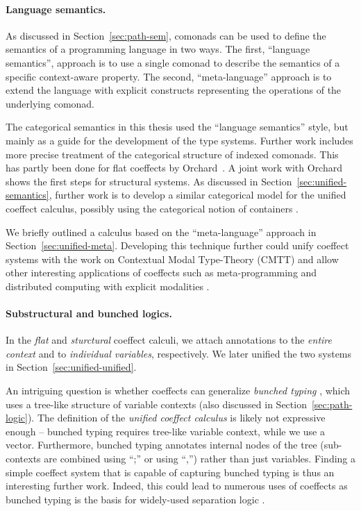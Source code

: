 \paragraph{Language semantics.}

As discussed in Section~\ref{sec:path-sem}, comonads can be used to define the semantics of a
programming language in two ways. The first, ``language semantics'', approach is to use a 
single comonad to describe the semantics of a specific context-aware property. The second,
``meta-language'' approach is to extend the language with explicit constructs representing the 
operations of the underlying comonad.

The categorical semantics in this thesis used the ``language semantics'' style, but mainly as a
guide for the development of the type systems. Further work includes more precise treatment of
the categorical structure of indexed comonads. This has partly been done for flat coeffects by
Orchard~\cite{comonads-dom-thesis}. A joint work with Orchard~\cite{coeffects-icfp14} shows the
first steps for structural systems. As discussed in Section~\ref{sec:unified-semantics}, further
work is to develop a similar categorical model for the unified coeffect calculus, possibly using
the categorical notion of containers \cite{types-containers}.

We briefly outlined a calculus based on the ``meta-language'' approach in Section~\ref{sec:unified-meta}.
Developing this technique further could unify coeffect systems with the work on Contextual Modal
Type-Theory (CMTT) \cite{logic-cmtt} and allow other interesting applications of coeffects such
as meta-programming \cite{logic-cmtt} and distributed computing with explicit modalities \cite{app-distributed-ml5}.


\paragraph{Substructural and bunched logics.}

In the \emph{flat} and \emph{sturctural} coeffect calculi, we attach annotations to the \emph{entire
context} and to \emph{individual variables}, respectively. We later unified the two systems 
in Section~\ref{sec:unified-unified}.

An intriguing question is whether coeffects can generalize \emph{bunched typing} \cite{substruct-bunched},
which uses a tree-like structure of variable contexts (also discussed in Section~\ref{sec:path-logic}).
The definition of the \emph{unified coeffect calculus} is likely not expressive enough -- bunched
typing requires tree-like variable context, while we use a vector. Furthermore, bunched typing
annotates internal nodes of the tree (sub-contexts are combined using ``;'' or using ``,'') rather 
than just variables. Finding a simple coeffect system that is capable of capturing bunched typing
is thus an interesting further work. Indeed, this could lead to numerous uses of coeffects as 
bunched typing is the basis for widely-used separation logic \cite{substruct-separation-logic}.

